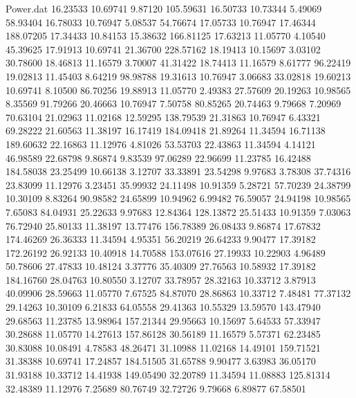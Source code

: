 \begin{filecontents}{Power.dat}
  16.23533   10.69741    9.87120  105.59631
  16.50733   10.73344    5.49069   58.93404
  16.78033   10.76947    5.08537   54.76674
  17.05733   10.76947   17.46344  188.07205
  17.34433   10.84153   15.38632  166.81125
  17.63213   11.05770    4.10540   45.39625
  17.91913   10.69741   21.36700  228.57162
  18.19413   10.15697    3.03102   30.78600
  18.46813   11.16579    3.70007   41.31422
  18.74413   11.16579    8.61777   96.22419
  19.02813   11.45403    8.64219   98.98788
  19.31613   10.76947    3.06683   33.02818
  19.60213   10.69741    8.10500   86.70256
  19.88913   11.05770    2.49383   27.57609
  20.19263   10.98565    8.35569   91.79266
  20.46663   10.76947    7.50758   80.85265
  20.74463    9.79668    7.20969   70.63104
  21.02963   11.02168   12.59295  138.79539
  21.31863   10.76947    6.43321   69.28222
  21.60563   11.38197   16.17419  184.09418
  21.89264   11.34594   16.71138  189.60632
  22.16863   11.12976    4.81026   53.53703
  22.43863   11.34594    4.14121   46.98589
  22.68798    9.86874    9.83539   97.06289
  22.96699   11.23785   16.42488  184.58038
  23.25499   10.66138    3.12707   33.33891
  23.54298    9.97683    3.78308   37.74316
  23.83099   11.12976    3.23451   35.99932
  24.11498   10.91359    5.28721   57.70239
  24.38799   10.30109    8.83264   90.98582
  24.65899   10.94962    6.99482   76.59057
  24.94198   10.98565    7.65083   84.04931
  25.22633    9.97683   12.84364  128.13872
  25.51433   10.91359    7.03063   76.72940
  25.80133   11.38197   13.77476  156.78389
  26.08433    9.86874   17.67832  174.46269
  26.36333   11.34594    4.95351   56.20219
  26.64233    9.90477   17.39182  172.26192
  26.92133   10.40918   14.70588  153.07616
  27.19933   10.22903    4.96489   50.78606
  27.47833   10.48124    3.37776   35.40309
  27.76563   10.58932   17.39182  184.16760
  28.04763   10.80550    3.12707   33.78957
  28.32163   10.33712    3.87913   40.09906
  28.59663   11.05770    7.67525   84.87070
  28.86863   10.33712    7.48481   77.37132
  29.14263   10.30109    6.21833   64.05558
  29.41363   10.55329   13.59570  143.47940
  29.68563   11.23785   13.98964  157.21344
  29.95663   10.15697    5.64533   57.33947
  30.28688   11.05770   14.27613  157.86128
  30.56189   11.16579    5.57371   62.23485
  30.83088   10.08491    4.78583   48.26471
  31.10988   11.02168   14.49101  159.71521
  31.38388   10.69741   17.24857  184.51505
  31.65788    9.90477    3.63983   36.05170
  31.93188   10.33712   14.41938  149.05490
  32.20789   11.34594   11.08883  125.81314
  32.48389   11.12976    7.25689   80.76749
  32.72726    9.79668    6.89877   67.58501

\end{filecontents}
